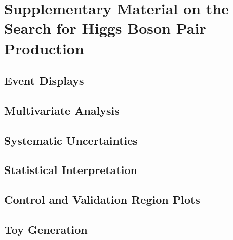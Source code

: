 \chapter{Supplementary Material on the Search for Higgs Boson Pair Production}

\section{Event Displays}%
\label{app:event_displays}

\clearpage

\section{Multivariate Analysis}%
\label{app:multivariate_analysis}

\clearpage

\section{Systematic Uncertainties}%
\label{app:uncertainties}

\clearpage

\section{Statistical Interpretation}%
\label{app:statistical_interpretation}

\clearpage

\section{Control and Validation Region Plots}%
\label{app:control_and_validation_regions}

\clearpage

\section{Toy Generation}%
\label{app:toy_generation}

\clearpage


% 


